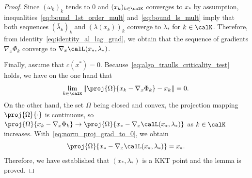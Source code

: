 \begin{proof}
	Since $(\omega_k)_k$ tends to $0$ and $(x_k)_{k\in \calK}$ converges to $x_*$ by assumption, inequalities~\eqref{eq:bound_1st_order_mult} and~\eqref{eq:bound_ls_mult} imply that both sequences $(\bar \lambda_k)_k$ and $(\lambda(x_k))_k$ converge to $\lambda_*$ for $k \in \calK$. Therefore, from identity~\eqref{eq:identity_al_lag_grad}, we obtain that the sequence of gradients $\nabla_x \Phi_k$ converge to $\nabla_x \calL(x_*,\lambda_*)$. 
	
	Finally, assume that $c(x^*) = 0$. Because~\eqref{eq:algo_traulls_criticality_test} holds, we have on the one hand that 
	\begin{equation}\label{eq:norm_proj_grad_to_0}
		\lim\limits_{k \in \calK} \|\proj{\Omega}{x_k-\nabla_x \Phi_k} - x_k\|= 0.
	\end{equation}
	On the other hand, the set $\Omega$ being closed and convex, the projection mapping $\proj{\Omega}{\cdot}$ is continuous, so $\proj{\Omega}{x_k-\nabla_x \Phi_k} \to \proj{\Omega}{x_*-\nabla_x \calL(x_*,\lambda_*)}$ as $k \in \calK$ increases. With~\eqref{eq:norm_proj_grad_to_0}, we obtain
	\[\proj{\Omega}{x_*-\nabla_x \calL(x_*,\lambda_*)} = x_*.\]
	Therefore, we have established that $(x_*,\lambda_*)$ is a KKT point and the lemma is proved.
\end{proof}

